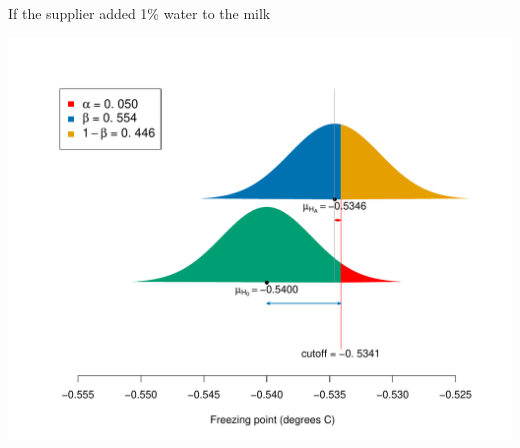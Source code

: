 \documentclass{beamer}\usepackage[]{graphicx}\usepackage[]{color}
\newenvironment{knitrout}{}{} %
\begin{document}
\begin{frame}[fragile]{If the supplier added 1\% water to the milk}
\begin{knitrout}\scriptsize
{}\color{fgcolor}

{\centering \includegraphics[width=1\linewidth]{figure/unnamed-chunk-14-1} 

}



\end{knitrout}
\end{frame}
\end{document}
